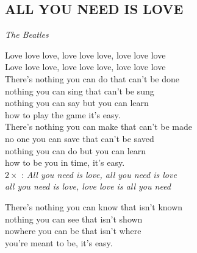 \begin{flushleft}
	\section*{\Huge ALL YOU NEED IS LOVE}
	\emph{The Beatles}
\end{flushleft}

Love love love, 
love love love, 
love love love\\

Love love love,
love love love, 
love love love\\

There's nothing you can do that can't be done\\
nothing you can sing that can't be sung\\
nothing you can say but you can learn\\
how to play the game it's easy.\\

There's nothing you can make that can't be made\\
no one you can save that can't be saved\\
nothing you can do but you can learn\\
how to be you in time, it's easy.\\

$2\times$ \textregistered:
\emph{All you need is love, 
all you need is love\\
all you need is love, love
love is all you need \hspace{0.6cm} \\
}

There's nothing you can know that isn't known\\
nothing you can see that isn't shown\\
nowhere you can be that isn't where\\
you're meant to be, it's easy.\\
\textregistered \textregistered

\newpage

